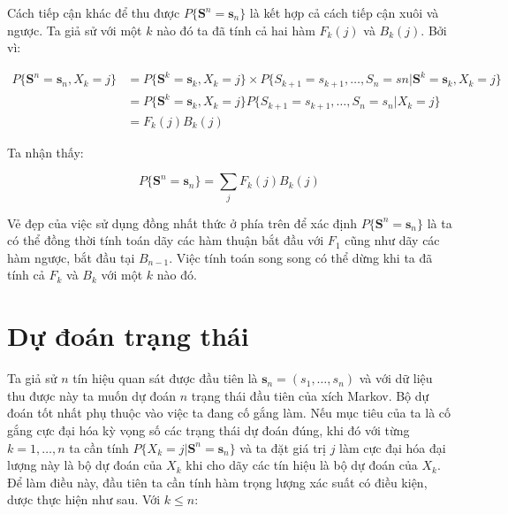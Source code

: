 \documentclass[14pt, a4paper]{article}
\numberwithin{equation}{section}
\numberwithin{figure}{section}
\theoremstyle{sltheorem}
\theoremstyle{soltheorem}
\numberwithin{dl}{section}
\numberwithin{md}{section}
\numberwithin{vd}{section}
\begin{document}
    Cách tiếp cận khác để thu được $P \lbrace \mathbf{S}^n = \mathbf{s}_n \rbrace$ là kết hợp cả cách tiếp cận xuôi và ngược.
    Ta giả sử với một $k$ nào đó ta đã tính cả hai hàm $F_k (j)$ và $B_k (j)$. Bởi vì:

    \begin{equation*}
        \begin{aligned}
            P \lbrace \mathbf{S}^n = \mathbf{s}_n, X_k = j \rbrace &= P \lbrace \mathbf{S}^k = \mathbf{s}_k, X_k = j \rbrace \times P \lbrace S_{k+1} = s_{k+1}, \dots, S_n = sn \vert \mathbf{S}^k = \mathbf{s}_k, X_k = j \rbrace \\
            &= P \lbrace \mathbf{S}^k = \mathbf{s}_k, X_k = j \rbrace P \lbrace S_{k+1} = s_{k+1}, \dots, S_n = s_n \vert X_k = j \rbrace \\
            &= F_k(j) B_k (j)
        \end{aligned}
    \end{equation*}

    Ta nhận thấy:

    \begin{equation*}
        P \lbrace \mathbf{S}^n = \mathbf{s}_n \rbrace = \sum_j F_k(j)B_k(j)
    \end{equation*}

    Vẻ đẹp của việc sử dụng đồng nhất thức ở phía trên để xác định $P \lbrace \mathbf{S}^n = \mathbf{s}_n \rbrace$ là ta có thể đồng thời tính toán dãy các hàm thuận bắt đầu với $F_1$ cũng như dãy các hàm ngược, bắt đầu tại $B_{n-1}$.
    Việc tính toán song song có thể dừng khi ta đã tính cả $F_k$ và $B_k$ với một $k$ nào đó.

    \section{Dự đoán trạng thái}

    Ta giả sử $n$ tín hiệu quan sát được đầu tiên là $\mathbf{s}_n = (s_1, \dots, s_n)$ và với dữ liệu thu được này ta muốn dự đoán $n$ trạng thái đầu tiên của xích Markov.
    Bộ dự đoán tốt nhất phụ thuộc vào việc ta đang cố gắng làm.
    Nếu mục tiêu của ta là cố gắng cực đại hóa kỳ vọng số các trạng thái dự đoán đúng, khi đó với từng $k=1, \dots, n$ ta cần tính $P \lbrace X_k = j \vert \mathbf{S}^n = \mathbf{s}_n \rbrace$ và ta đặt giá trị $j$ làm cực đại hóa đại lượng này là bộ dự đoán của $X_k$ khi cho dãy các tín hiệu là bộ dự đoán của $X_k$.
    Để làm điều này, đầu tiên ta cần tính hàm trọng lượng xác suất có điều kiện, dược thực hiện như sau.
    Với $k \leq n$:
\end{document}
